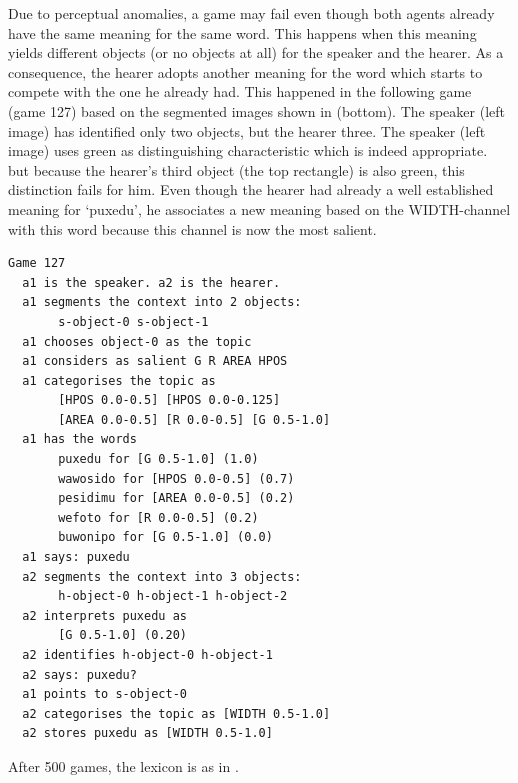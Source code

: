 Due to perceptual anomalies, a game may fail even though 
both agents already have the same meaning for the 
same word. This happens when this meaning yields different 
objects (or no objects at all) for the speaker and the hearer. 
As a consequence, the hearer adopts another meaning for 
the word which starts to compete with the one he already had. 
This happened in the following game (game 127)
based on the segmented images shown in  (bottom). The speaker (left image) has identified
only two objects, but the hearer three. The 
speaker (left image) uses green as distinguishing 
characteristic which is indeed appropriate. but 
because the hearer's third object (the top rectangle) is 
also green, this distinction fails for him.  
Even though the hearer had already a well established
meaning for `puxedu', he associates a new meaning 
based on the WIDTH-channel with this word because this 
channel is now the most salient. 
\begin{verbatim}
Game 127
  a1 is the speaker. a2 is the hearer. 
  a1 segments the context into 2 objects: 
       s-object-0 s-object-1
  a1 chooses object-0 as the topic 
  a1 considers as salient G R AREA HPOS 
  a1 categorises the topic as 
       [HPOS 0.0-0.5] [HPOS 0.0-0.125]
       [AREA 0.0-0.5] [R 0.0-0.5] [G 0.5-1.0]
  a1 has the words
       puxedu for [G 0.5-1.0] (1.0)
       wawosido for [HPOS 0.0-0.5] (0.7)
       pesidimu for [AREA 0.0-0.5] (0.2)
       wefoto for [R 0.0-0.5] (0.2)
       buwonipo for [G 0.5-1.0] (0.0)
  a1 says: puxedu
  a2 segments the context into 3 objects: 
       h-object-0 h-object-1 h-object-2
  a2 interprets puxedu as
       [G 0.5-1.0] (0.20)
  a2 identifies h-object-0 h-object-1
  a2 says: puxedu?
  a1 points to s-object-0
  a2 categorises the topic as [WIDTH 0.5-1.0]
  a2 stores puxedu as [WIDTH 0.5-1.0]
\end{verbatim}

After 500 games, the lexicon is as in . 

